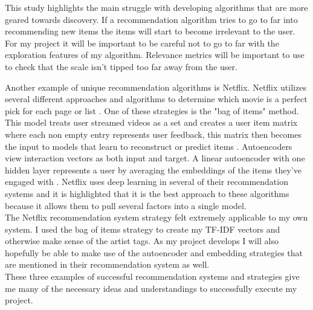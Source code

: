 \documentclass[10pt,twocolumn]{article}
\begin{document}
\indent This study highlights the main struggle with developing algorithms that are more geared towards discovery. If a recommendation algorithm tries to go to far into recommending new items the items will start to become irrelevant to the user. For my project it will be important to be careful not to go to far with the exploration features of my algorithm. Relevance metrics will be important to use to check that the scale isn't tipped too far away from the user. 

\indent Another example of unique recommendation algorithms is Netflix. Netflix utilizes several different approaches and algorithms to determine which movie is a perfect pick for each page or list \cite{Netflix}. One of these strategies is the "bag of items" method. This model treats user streamed videos as a set and creates a user item matrix where each non empty entry represents user feedback, this matrix then becomes the input to models that learn to reconstruct or predict items \cite{Netflix}. Autoencoders view interaction vectors as both input and target. A linear autoencoder with one hidden layer represents a user by averaging the embeddings of the items they've engaged with \cite{Netflix}. Netflix uses deep learning in several of their recommendation systems and it is highlighted that it is the best approach to these algorithms because it allows them to pull several factors into a single model.\\

\indent The Netflix recommendation system strategy felt extremely applicable to my own system. I used the bag of items strategy to create my TF-IDF vectors and otherwise make sense of the artist tags. As my project develops I will also hopefully be able to make use of the autoencoder and embedding strategies that are mentioned in their recommendation system as well.\\

\indent These three examples of successful recommendation systems and strategies give me many of the necessary ideas and understandings to successfully execute my project.
\end{document}
